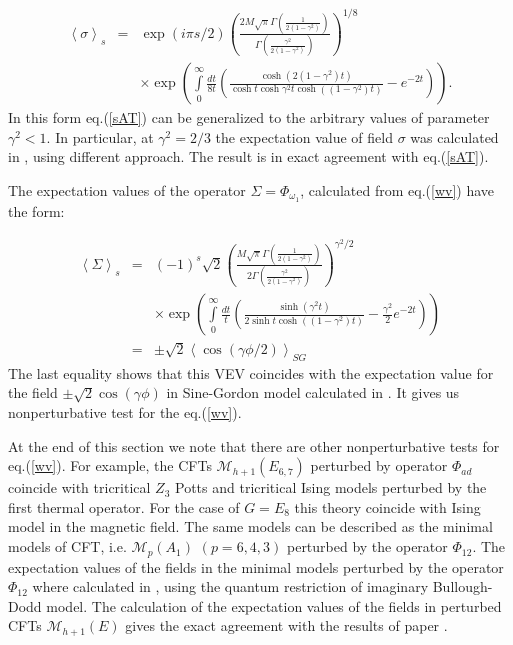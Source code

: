 \documentclass[a4paper,12pt]{article}
\begin{document}
\begin{eqnarray}
\left\langle \sigma \right\rangle _s &=&\exp (i\pi s/2)\left( \frac{2M
\sqrt{\pi }\Gamma \left( \frac 1{2(1-\gamma ^2)}\right) }
{\Gamma \left( \frac{\gamma ^2}{2(1-\gamma ^2)}\right) }\right) ^{1/8}  
\nonumber \\
&&\times \exp \left( \int\limits_0^\infty \frac{dt}{8t}
\left( \frac{\cosh (2(1-\gamma ^2)t)}
{\cosh t\cosh \gamma ^2t\cosh ((1-\gamma ^2)t)}-e^{-2t}\right) \right) .
\label{sAT}
\end{eqnarray}
In this form eq.(\ref{sAT}) can be generalized to the arbitrary values of
parameter $\gamma ^2<1.$ In particular, at $\gamma ^2=2/3$ the expectation
value of field $\sigma $ was calculated in \cite{PBVF}, using different
approach. The result is in exact agreement with eq.(\ref{sAT}).

The expectation values of the operator $\Sigma =\Phi _{\omega _1}$,
calculated from eq.(\ref{wv}) have the form:

\begin{eqnarray}
\left\langle \Sigma \right\rangle _s &=
&(-1)^s\sqrt{2}\left( \frac{M\sqrt{\pi }\Gamma 
\left( \frac 1{2(1-\gamma ^2)}\right) }{2\Gamma 
\left( \frac{\gamma ^2}{2(1-\gamma ^2)}\right) }\right) ^{\gamma ^2/2}  
\nonumber \\
&&\times \exp \left( \int\limits_0^\infty \frac{dt}t
\left( \frac{\sinh (\gamma ^2t)}{2\sinh
t\cosh ((1-\gamma ^2)t)}-\frac{\gamma ^2}2e^{-2t}\right) \right)   \nonumber
\\
&=&\pm \sqrt{2}\left\langle \cos (\gamma \phi /2)\right\rangle _{SG}
\label{ssAT}
\end{eqnarray}
The last equality shows that this VEV coincides with the
expectation value for the field  $\pm\sqrt{2}\cos (\gamma \phi )$ 
in Sine-Gordon model calculated in \cite{LZ}. 
It gives us nonperturbative test for the
eq.(\ref{wv}).

At the end of this section we note that there are other nonperturbative
tests for eq.(\ref{wv}). For example, the CFTs $\mathcal{M}_{h+1}(E_{6,7})$
perturbed by operator $\Phi _{ad}$ coincide with tricritical $Z_3$ Potts and
tricritical Ising models perturbed by the first thermal operator. For the
case of $G=E_8$ this theory coincide with Ising model in the magnetic field.
The same models can be described as the minimal models of CFT, i.e. 
$\mathcal{M}_p(A_1)$ $(p=6,4,3)$ perturbed by the operator $\Phi _{12}$. 
The expectation values of the fields in the minimal models perturbed by the
operator $\Phi _{12}$ where calculated in \cite{FLZ}, using the quantum
restriction of imaginary Bullough-Dodd model. The calculation of the
expectation values of the fields in perturbed CFTs $\mathcal{M}_{h+1}(E)$
gives the exact agreement with the results of paper \cite{FLZ}.
\end{document}
